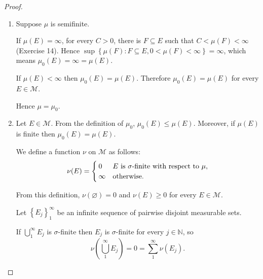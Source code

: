 \begin{proof}
\begin{enumerate}[itemsep=0pt,label=\textbf{\alph*.}]
              which means
              \[
                  \sum_{1}^{\infty} \mu_{0}(E_{j}) \le \mu_{0}\left(\bigcup_{1}^{\infty} E_{j}\right).
              \]

              Hence \( \sum_{1}^{\infty} \mu_{0}(E_{j}) = \mu_{0}\left(\bigcup_{1}^{\infty} E_{j}\right) \), so \( \mu_{0} \) is a measure on \( (X, \mathcal{M}) \).

              Suppose \( E \in \mathcal{M} \) and \( \mu_{0}(E) = \infty \) then \( \sup\left\{ \mu(F) : F \subseteq E \text{ and } \mu(F) < \infty \right\} = \infty \). So there is a subset \( F \subseteq E \) such that \( 0 < \mu(F) < \infty \). By the definition of \( \mu_{0} \), \( 0 < \mu_{0}(F) = \mu(F) < \infty \). Therefore \( \mu_{0} \) is semifinite.
        \item Suppose \( \mu \) is semifinite.

              If \( \mu(E) = \infty \), for every \( C > 0 \), there is \( F \subseteq E \) such that \( C < \mu(F) < \infty \) (Exercise 14). Hence \( \sup\left\{ \mu(F) : F \subseteq E, 0 < \mu(F) < \infty \right\} = \infty \), which means \( \mu_{0}(E) = \infty = \mu(E) \).

              If \( \mu(E) < \infty \) then \( \mu_{0}(E) = \mu(E) \). Therefore \( \mu_{0}(E) = \mu(E) \) for every \( E \in \mathcal{M} \).

              Hence \( \mu = \mu_{0} \).
        \item Let \( E \in \mathcal{M} \). From the definition of \( \mu_{0} \), \( \mu_{0}(E) \le \mu(E) \). Moreover, if \( \mu(E) \) is finite then \( \mu_{0}(E) = \mu(E) \).

              We define a function \( \nu \) on \( \mathcal{M} \) as follows:
              \[
                  \nu(E) = \begin{cases}
                      0      & \text{\( E \) is \( \sigma \)-finite with respect to \( \mu \)}, \\
                      \infty & \text{otherwise.}
                  \end{cases}
              \]

              From this definition, \( \nu(\varnothing) = 0 \) and \( \nu(E) \ge 0 \) for every \( E \in \mathcal{M} \).

              Let \( {\left\{ E_{j} \right\}}_{1}^{\infty} \) be an infinite sequence of pairwise disjoint measurable sets.

              If \( \bigcup_{1}^{\infty} E_{j} \) is \( \sigma \)-finite then \( E_{j} \) is \( \sigma \)-finite for every \( j \in \mathbb{N} \), so
              \[
                  \nu\left(\bigcup_{1}^{\infty} E_{j}\right) = 0 = \sum_{1}^{\infty} \nu(E_{j}).
              \]


\end{enumerate}
\end{proof}
